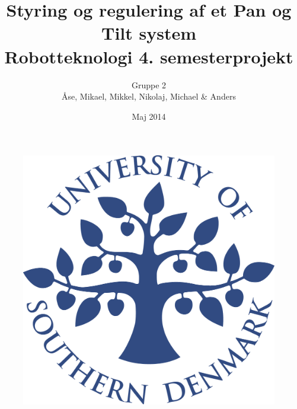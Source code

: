 \title{Styring og regulering af et Pan og Tilt system \\Robotteknologi 4. semesterprojekt}
\author{Gruppe 2 \\ Åse, Mikael, Mikkel, Nikolaj, Michael \& Anders}
\date{Maj 2014}
\begin{figure}
\centering
\includegraphics[width=1\textwidth]{graphics/forside.png}
\end{figure}
\maketitle


